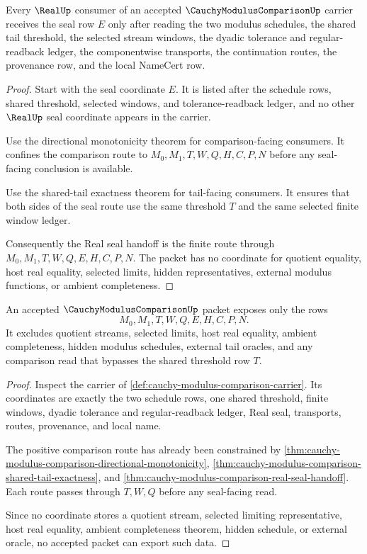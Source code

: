 \begin{theorem}
\label{thm:cauchy-modulus-comparison-real-seal-handoff}
Every $\RealUp$ consumer of an accepted $\CauchyModulusComparisonUp$ carrier receives the seal row $E$ only after reading the two modulus schedules, the shared tail threshold, the selected stream windows, the dyadic tolerance and regular-readback ledger, the componentwise transports, the continuation routes, the provenance row, and the local NameCert row.
\end{theorem}
\begin{proof}
Start with the seal coordinate $E$. It is listed after the schedule rows, shared threshold, selected windows, and tolerance-readback ledger, and no other $\RealUp$ seal coordinate appears in the carrier.

Use the directional monotonicity theorem for comparison-facing consumers. It confines the comparison route to $M_0,M_1,T,W,Q,H,C,P,N$ before any seal-facing conclusion is available.

Use the shared-tail exactness theorem for tail-facing consumers. It ensures that both sides of the seal route use the same threshold $T$ and the same selected finite window ledger.

Consequently the Real seal handoff is the finite route through $M_0,M_1,T,W,Q,E,H,C,P,N$. The packet has no coordinate for quotient equality, host real equality, selected limits, hidden representatives, external modulus functions, or ambient completeness.
\end{proof}

\begin{theorem}
\label{thm:cauchy-modulus-comparison-nonescape-boundary}
An accepted $\CauchyModulusComparisonUp$ packet exposes only the rows
$$
M_0,M_1,T,W,Q,E,H,C,P,N.
$$
It excludes quotient streams, selected limits, host real equality, ambient completeness, hidden modulus schedules, external tail oracles, and any comparison read that bypasses the shared threshold row $T$.
\end{theorem}
\begin{proof}
Inspect the carrier of \autoref{def:cauchy-modulus-comparison-carrier}. Its coordinates are exactly the two schedule rows, one shared threshold, finite windows, dyadic tolerance and regular-readback ledger, Real seal, transports, routes, provenance, and local name.

The positive comparison route has already been constrained by \autoref{thm:cauchy-modulus-comparison-directional-monotonicity}, \autoref{thm:cauchy-modulus-comparison-shared-tail-exactness}, and \autoref{thm:cauchy-modulus-comparison-real-seal-handoff}. Each route passes through $T,W,Q$ before any seal-facing read.

Since no coordinate stores a quotient stream, selected limiting representative, host real equality, ambient completeness theorem, hidden schedule, or external oracle, no accepted packet can export such data.
\end{proof}

